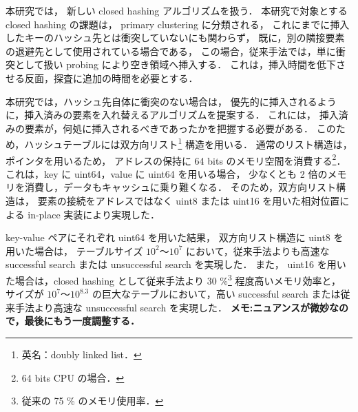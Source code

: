 
本研究では，
新しい closed hashing アルゴリズムを扱う．
本研究で対象とする closed hashing の課題は，
primary clustering に分類される，
これにまでに挿入したキーのハッシュ先とは衝突していないにも関わらず，
既に，別の隣接要素の退避先として使用されている場合である，
この場合，従来手法では，単に衝突として扱い probing により空き領域へ挿入する．
これは，挿入時間を低下させる反面，探査に追加の時間を必要とする．

本研究では，ハッシュ先自体に衝突のない場合は，
優先的に挿入されるように，挿入済みの要素を入れ替えるアルゴリズムを提案する．
これには，
挿入済みの要素が，何処に挿入されるべきであったかを把握する必要がある．
このため，ハッシュテーブルには双方向リスト\footnote{英名：doubly linked list．} 構造を用いる．
通常のリスト構造は，ポインタを用いるため，
アドレスの保持に 64 bits のメモリ空間を消費する\footnote{64 bits CPU の場合．}．
これは，key に uint64，value に uint64 を用いる場合，
少なくとも 2 倍のメモリを消費し，データもキャッシュに乗り難くなる．
そのため，双方向リスト構造は，
要素の接続をアドレスではなく uint8 または uint16 を用いた相対位置による in-place 実装により実現した．

key-value ペアにそれぞれ uint64 を用いた結果，
双方向リスト構造に uint8 を用いた場合は，
テーブルサイズ $10^2〜10^{7}$ において，従来手法よりも高速な successful search または unsuccessful search を実現した．
また，
uint16 を用いた場合は，closed hashing として従来手法より 30 \%\footnote{従来の 75 \% のメモリ使用率．} 程度高いメモリ効率と，
サイズが $10^7〜10^{8.3}$ の巨大なテーブルにおいて，高い successful search または従来手法より高速な unsuccessful search を実現した．
{\bf \color{red}メモ:ニュアンスが微妙なので，最後にもう一度調整する．}






